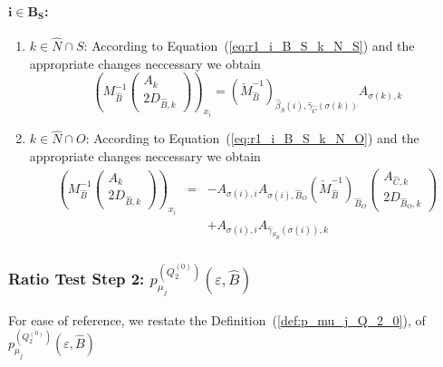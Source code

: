 \documentclass[a4paper]{article}
\newcommand{\pmu}[2]{\ensuremath{p_{\mu_{j}}^{(#1)}(\varepsilon, #2)}}
\begin{document}
\paragraph{$\mathbf{i \in B_{S}}$:}
\begin{enumerate}
\item $k \in \hat{N} \cap S$:
According to Equation~(\ref{eq:r1_i_B_S_k_N_S}) and the appropriate changes
neccessary we obtain
\begin{equation}
\label{eq:r2_i_B_S_k_N_S}
\left(
  M_{\hat{B}}^{-1}
  \left(\begin{array}{c}
          A_{k} \\
	  \hline
	  2D_{\hat{B}, k}
	\end{array}
  \right)
\right)_{x_{i}}
=
\left(\check{M}_{\hat{B}}^{-1}\right)_{\hat{\beta}_{S}(i),
\hat{\gamma}_{\hat{C}}(\sigma(k))}
  A_{\sigma(k), k}
\end{equation}
\item $k \in \hat{N} \cap O$:
According to Equation~(\ref{eq:r1_i_B_S_k_N_O}) and the appropriate changes
neccessary we obtain
\begin{eqnarray}
\label{eq:r2_i_B_S_k_N_O}
\left(
  M_{\hat{B}}^{-1}
  \left(\begin{array}{c}
          A_{k} \\
	  \hline
	  2D_{\hat{B}, k}
	\end{array}
  \right)
\right)_{x_{i}}
&=&
-A_{\sigma(i),i}A_{\sigma(i), \hat{B}_{O}}
\left(\check{M}_{\hat{B}}^{-1}\right)_{\hat{B}_{O}}
\left(\begin{array}{c}
        A_{\hat{C},k} \\
	\hline
	2D_{\hat{B}_{O},k}
       \end{array}
\right)
\nonumber \\
&&
+A_{\sigma(i), i}A_{\hat{\gamma}_{S_{\hat{B}}}(\sigma(i)), k}
\end{eqnarray}
\end{enumerate}

\subsubsection{Ratio Test Step 2:
\pmu{Q_{2}^{(0)}}{\hat{B}}}
For ease of reference, we restate the Definition~(\ref{def:p_mu_j_Q_2_0}),
of \pmu{Q_{2}^{(0)}}{\hat{B}}
\end{document}
